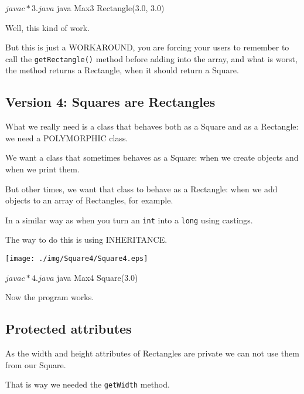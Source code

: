 \documentclass[a4paper, 9pt]{extarticle}
\begin{document}
\begin{blackboard}
$ javac *3.java
$ java Max3
Rectangle(3.0, 3.0)
\end{blackboard}

Well, this kind of work.

But this is just a WORKAROUND, you are forcing your users to remember to call
the \verb+getRectangle()+ method before adding into the array, and what is
worst, the method returns a Rectangle, when it should return a Square.



\newpage
\subsection{Version 4: Squares are Rectangles}

What we really need is a class that behaves both as a Square and as a
Rectangle: we need a POLYMORPHIC class.

We want a class that sometimes behaves as a Square: when we create objects
and when we print them.

But other times, we want that class to behave as a Rectangle: when we add
objects to an array of Rectangles, for example.

In a similar way as when you turn an \verb+int+ into a \verb+long+ using
castings.

The way to do this is using INHERITANCE.

\begin{multicols}{2}
  \begin{center}
    \texttt{[image: ./img/Square4/Square4.eps]}
  \end{center}
\columnbreak
\end{multicols}

\begin{blackboard}
$ javac *4.java
$ java Max4
Square(3.0)
\end{blackboard}

Now the program works.

\subsection{Protected attributes}

As the width and height attributes of Rectangles are private we can not use
them from our Square.

That is way we needed the \verb+getWidth+ method.
\end{document}
